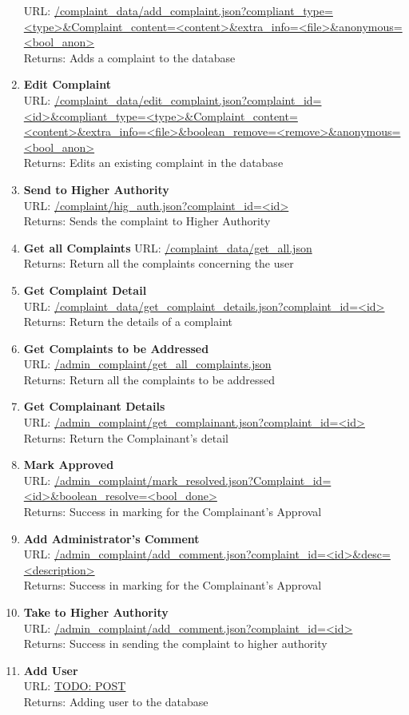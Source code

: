 \documentclass{article}
\begin{document}
\begin{enumerate}
						URL: \url{/complaint_data/add_complaint.json?compliant_type=<type>&Complaint_content=<content>&extra_info=<file>&anonymous=<bool_anon>}\\
						Returns: Adds a complaint to the database
					\item \textbf{Edit Complaint} \\
						URL: \url{/complaint_data/edit_complaint.json?complaint_id=<id>&compliant_type=<type>&Complaint_content=<content>&extra_info=<file>&boolean_remove=<remove>&anonymous=<bool_anon>}\\
						Returns: Edits an existing complaint in the database
					\item \textbf{Send to Higher Authority} \\
						URL: \url{/complaint/hig_auth.json?complaint_id=<id>}\\
						Returns: Sends the complaint to Higher Authority
					\item \textbf{Get all Complaints}
						URL: \url{/complaint_data/get_all.json}\\
						Returns: Return all the complaints concerning the user
					\item \textbf{Get Complaint Detail}	\\					URL: \url{/complaint_data/get_complaint_details.json?complaint_id=<id>}\\
						Returns: Return the details of a complaint 
					\item \textbf{Get Complaints to be Addressed} \\		URL: \url{/admin_complaint/get_all_complaints.json}\\
					Returns: Return all the complaints to be addressed
					\item \textbf{Get Complainant Details} \\
					URL: \url{/admin_complaint/get_complainant.json?complaint_id=<id>}\\
					Returns: Return  the Complainant's detail
					\item \textbf{Mark Approved} \\
					URL: \url{/admin_complaint/mark_resolved.json?Complaint_id=<id>&boolean_resolve=<bool_done>}\\
					Returns: Success in marking for the Complainant's Approval
					\item \textbf{Add Administrator's Comment} \\ 
					URL: \url{/admin_complaint/add_comment.json?complaint_id=<id>&desc=<description>}\\
					Returns: Success in marking for the Complainant's Approval
					\item \textbf{Take to Higher Authority} \\ 
					URL: \url{/admin_complaint/add_comment.json?complaint_id=<id>}\\
					Returns: Success in sending the complaint to higher authority
					\item \textbf{Add User} \\ 
					URL: \url{TODO: POST}\\
					Returns: Adding user to the database 



\end{enumerate}
\end{document}
